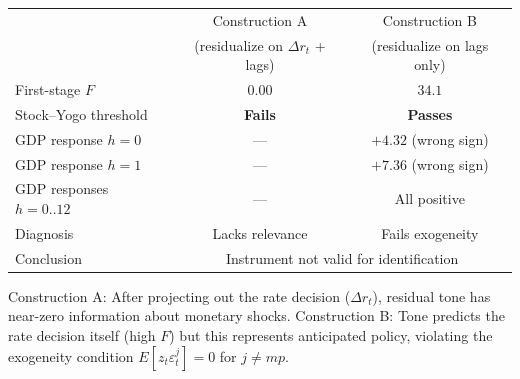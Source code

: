 
\begin{tabular}{lcc}
\toprule
& Construction A & Construction B \\
& (residualize on $\Delta r_t$ + lags) & (residualize on lags only) \\
\midrule
    First-stage $F$ & $0.00$ & $34.1$ \\
    Stock--Yogo threshold & \textbf{Fails} & \textbf{Passes} \\
    GDP response $h=0$ & --- & $+4.32$ (wrong sign) \\
    GDP response $h=1$ & --- & $+7.36$ (wrong sign) \\
    GDP responses $h=0..12$ & --- & All positive \\
    Diagnosis & Lacks relevance & Fails exogeneity \\
\midrule
    Conclusion & \multicolumn{2}{c}{Instrument not valid for identification} \\
\bottomrule
\end{tabular}
\begin{tablenotes}
\small Construction A: After projecting out the rate decision ($\Delta r_t$),
residual tone has near-zero information about monetary shocks.
Construction B: Tone predicts the rate decision itself (high $F$) but this
represents anticipated policy, violating the exogeneity condition
$E[z_t \varepsilon^j_t]=0$ for $j\neq mp$.
\end{tablenotes}
